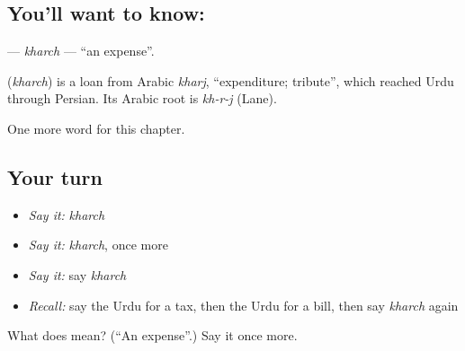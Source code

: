 \subsection*{You'll want to know: }
\textbf{} — \emph{kharch} — \textquotedblleft{}an expense\textquotedblright{}.

\begin{cousinweb}
\textbf{} (\emph{kharch}) is a loan from Arabic \emph{kharj}, \textquotedblleft{}expenditure; tribute\textquotedblright{}, which reached Urdu through Persian. Its Arabic root is \emph{kh-r-j} (Lane).
\end{cousinweb}

\begin{grammarlens}[title={What you've built}]
One more word for this chapter.
\end{grammarlens}

\subsection*{Your turn}
\begin{itemize}
\raggedright
  \item \emph{Say it:} \emph{kharch}
  \item \emph{Say it:} \emph{kharch}, once more
  \item \emph{Say it:} say \emph{kharch}
  \item \emph{Recall:} say the Urdu for a tax, then the Urdu for a bill, then say \emph{kharch} again
\end{itemize}

\begin{tcolorbox}[breakable,colback=teal!4,colframe=teal!35!black,title={Before you move on}]
What does  mean? (\textquotedblleft{}An expense\textquotedblright{}.) Say it once more.
\end{tcolorbox}
